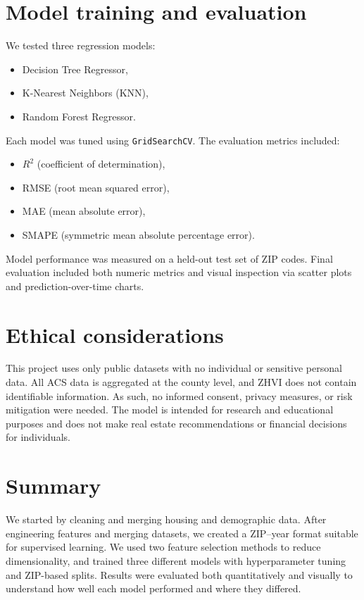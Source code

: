 \section{Model training and evaluation}
We tested three regression models:
\begin{itemize}
    \item Decision Tree Regressor,
    \item K-Nearest Neighbors (KNN),
    \item Random Forest Regressor.
\end{itemize}

Each model was tuned using \texttt{GridSearchCV}. The evaluation metrics included:
\begin{itemize}
    \item $R^2$ (coefficient of determination),
    \item RMSE (root mean squared error),
    \item MAE (mean absolute error),
    \item SMAPE (symmetric mean absolute percentage error).
\end{itemize}

Model performance was measured on a held-out test set of ZIP codes. Final evaluation included both numeric metrics and visual inspection via scatter plots and prediction-over-time charts.

\section{Ethical considerations}
This project uses only public datasets with no individual or sensitive personal data. All ACS data is aggregated at the county level, and ZHVI does not contain identifiable information. As such, no informed consent, privacy measures, or risk mitigation were needed. The model is intended for research and educational purposes and does not make real estate recommendations or financial decisions for individuals.

\section{Summary}
We started by cleaning and merging housing and demographic data. After engineering features and merging datasets, we created a ZIP–year format suitable for supervised learning. We used two feature selection methods to reduce dimensionality, and trained three different models with hyperparameter tuning and ZIP-based splits. Results were evaluated both quantitatively and visually to understand how well each model performed and where they differed.
